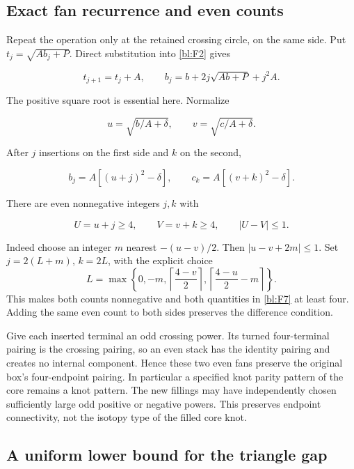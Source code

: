 \subsection{Exact fan recurrence and even counts}\label{bl:exact-fan-recurrence-and-even-counts}

Repeat the operation only at the retained crossing circle, on the same side. Put
\(t_j=\sqrt{Ab_j+P}\). Direct substitution into \eqref{bl:F2} gives

\begin{equation}\label{bl:F5}
t_{j+1}=t_j+A,\qquad
b_j=b+2j\sqrt{Ab+P}+j^2A.
\end{equation}

The positive square root is essential here. Normalize

\[
u=\sqrt{b/A+\delta},\qquad v=\sqrt{c/A+\delta}.
\]

After \(j\) insertions on the first side and \(k\) on the second,

\begin{equation}\label{bl:F6}
b_j=A[(u+j)^2-\delta],\qquad
c_k=A[(v+k)^2-\delta].
\end{equation}

There are even nonnegative integers \(j,k\) with

\begin{equation}\label{bl:F7}
U=u+j\ge4,\qquad V=v+k\ge4,\qquad |U-V|\le1.
\end{equation}

Indeed choose an integer \(m\) nearest \(-(u-v)/2\). Then
\(|u-v+2m|\le1\). Set \(j=2(L+m)\), \(k=2L\), with the explicit choice
\[
 L=\max\left\{0,-m,
       \left\lceil\frac{4-v}{2}\right\rceil,
       \left\lceil\frac{4-u}{2}-m\right\rceil\right\}.
\]
This makes both counts nonnegative and both quantities in
\eqref{bl:F7} at least four. Adding the same even count to both
sides preserves the difference condition.

Give each inserted terminal an odd crossing power. Its turned
four-terminal pairing is the crossing pairing, so an even stack has
the identity pairing and creates no internal component. Hence these
two even fans preserve the original box's four-endpoint pairing. In
particular a specified knot parity pattern of the core remains a knot
pattern. The new fillings may have independently chosen sufficiently
large odd positive or negative powers. This preserves endpoint
connectivity, not the isotopy type of the filled core knot.

\subsection{A uniform lower bound for the triangle gap}
\label{bl:triangle-gap}


